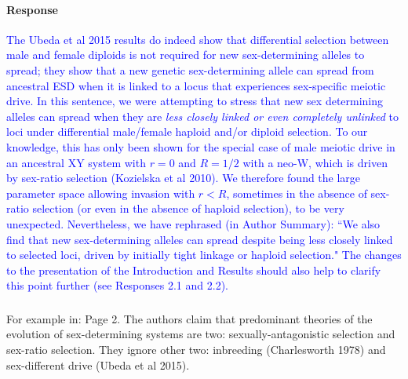 \documentclass[10pt,letterpaper]{article}
\begin{document}
\noindent\paragraph{Response}
\textcolor{blue}{
The Ubeda et al 2015 results do indeed show that differential selection between male and female diploids is not required for new sex-determining alleles to spread; they show that a new genetic sex-determining allele can spread from ancestral ESD when it is linked to a locus that experiences sex-specific meiotic drive. 
In this sentence, we were attempting to stress that new sex determining alleles can spread when they are \textit{less closely linked or even completely unlinked} to loci under differential male/female haploid and/or diploid selection. 
To our knowledge, this has only been shown for the special case of male meiotic drive in an ancestral XY system with $r=0$ and $R=1/2$ with a neo-W, which is driven by sex-ratio selection (Kozielska et al 2010). 
We therefore found the large parameter space allowing invasion with $r<R$, sometimes in the absence of sex-ratio selection (or even in the absence of haploid selection), to be very unexpected.
Nevertheless, we have rephrased (in Author Summary): ``We also find that new sex-determining alleles can spread despite being less closely linked to selected loci, driven by initially tight linkage or haploid selection." 
The changes to the presentation of the Introduction and Results should also help to clarify this point further (see Responses 2.1 and 2.2).
}

\noindent\subsubsection{}
For example in: Page 2. The authors claim that predominant theories of the evolution of sex-determining systems are two: sexually-antagonistic selection and sex-ratio selection. They ignore other two: inbreeding (Charlesworth 1978) and sex-different drive (Ubeda et al 2015). 
\end{document}
